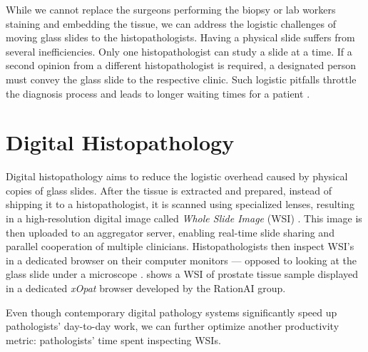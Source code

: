 While we cannot replace the surgeons performing the biopsy or lab workers staining and embedding the tissue, we can address the logistic challenges of moving glass slides to the histopathologists.
Having a physical slide suffers from several inefficiencies. 
Only one histopathologist can study a slide at a time. If a second opinion from a different histopathologist is required, a designated person must convey the glass slide to the respective clinic.
Such logistic pitfalls throttle the diagnosis process and leads to longer waiting times for a patient \cite{from-traditional-to-digital-histopathology}.

\section{Digital Histopathology}

Digital histopathology aims to reduce the logistic overhead caused by physical copies of glass slides.
After the tissue is extracted and prepared, instead of shipping it to a histopathologist, it is scanned using specialized lenses, resulting in a high-resolution digital image called \emph{Whole Slide Image} (WSI) \cite{from-traditional-to-digital-histopathology}.
This image is then uploaded to an aggregator server, enabling real-time slide sharing and parallel cooperation of multiple clinicians.
Histopathologists then inspect WSI's in a dedicated browser on their computer monitors --- opposed to looking at the glass slide under a microscope \cite{digital-histopathology-process}.  shows a WSI of prostate tissue sample displayed in a dedicated \emph{xOpat} browser developed by the RationAI group.

Even though contemporary digital pathology systems significantly speed up pathologists' day-to-day work, we can further optimize another productivity metric: pathologists' time spent inspecting WSIs.

